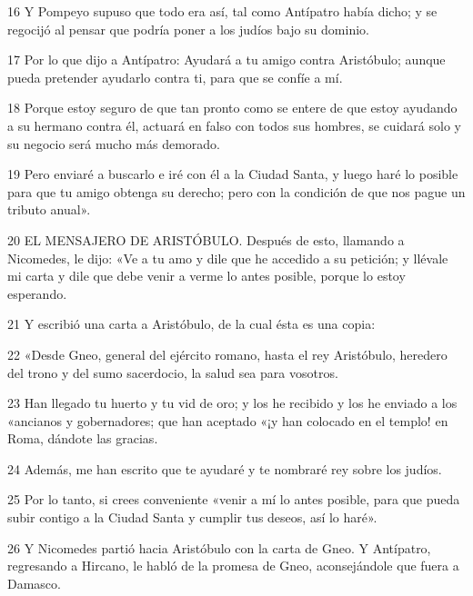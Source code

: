 \par 16 Y Pompeyo supuso que todo era así, tal como Antípatro había dicho; y se regocijó al pensar que podría poner a los judíos bajo su dominio.

\par 17 Por lo que dijo a Antípatro: Ayudará a tu amigo contra Aristóbulo; aunque pueda pretender ayudarlo contra ti, para que se confíe a mí.

\par 18 Porque estoy seguro de que tan pronto como se entere de que estoy ayudando a su hermano contra él, actuará en falso con todos sus hombres, se cuidará solo y su negocio será mucho más demorado.

\par 19 Pero enviaré a buscarlo e iré con él a la Ciudad Santa, y luego haré lo posible para que tu amigo obtenga su derecho; pero con la condición de que nos pague un tributo anual».

\par 20 EL MENSAJERO DE ARISTÓBULO. Después de esto, llamando a Nicomedes, le dijo: «Ve a tu amo y dile que he accedido a su petición; y llévale mi carta y dile que debe venir a verme lo antes posible, porque lo estoy esperando.

\par 21 Y escribió una carta a Aristóbulo, de la cual ésta es una copia:

\par 22 «Desde Gneo, general del ejército romano, hasta el rey Aristóbulo, heredero del trono y del sumo sacerdocio, la salud sea para vosotros.

\par 23 Han llegado tu huerto y tu vid de oro; y los he recibido y los he enviado a los «ancianos y gobernadores; que han aceptado «¡y han colocado en el templo! en Roma, dándote las gracias.

\par 24 Además, me han escrito que te ayudaré y te nombraré rey sobre los judíos.

\par 25 Por lo tanto, si crees conveniente «venir a mí lo antes posible, para que pueda subir contigo a la Ciudad Santa y cumplir tus deseos, así lo haré».

\par 26 Y Nicomedes partió hacia Aristóbulo con la carta de Gneo. Y Antípatro, regresando a Hircano, le habló de la promesa de Gneo, aconsejándole que fuera a Damasco.


